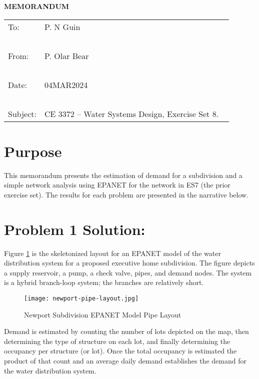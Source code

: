 \documentclass[12pt]{article}
\begin{document}
\begin{center}
\textbf{MEMORANDUM}
\end{center}
\begingroup
\begin{tabular}{p{1in} p{5in}}
To: & P. N Guin \\ ~\\
From: & P. Olar Bear \\ ~\\
Date: & 04MAR2024 \\ ~\\
Subject: & CE 3372 -- Water Systems Design, Exercise Set 8. ~\\


\end{tabular}
\endgroup
\section*{\small{Purpose}}  
This memorandum presents the estimation of demand for a subdivision and a simple network analysis using EPANET for the network in ES7 (the prior exercise set).  
The results for each problem are presented in the narrative below.
\section*{\small{Problem 1 Solution:}}
Figure \ref{fig:newport-pipe-layout} is the skeletonized layout for an EPANET model of the water distribution system for a proposed executive home subdivision.  
The figure depicts a supply reservoir, a pump, a check valve, pipes, and demand nodes.  
The system is a hybrid branch-loop system; the branches are relatively short.

\begin{figure}[h!] %
\centering
   \texttt{[image: newport-pipe-layout.jpg]}
   \caption{Newport Subdivision EPANET Model Pipe Layout}
   \label{fig:newport-pipe-layout} 
\end{figure}

Demand is estimated by counting the number of lots depicted on the map, then determining the type of structure on each lot, and finally determining the occupancy per structure (or lot).  Once the total occupancy is estimated the product of that count and an average daily demand establishes the demand for the water distribution system. 
\end{document}
